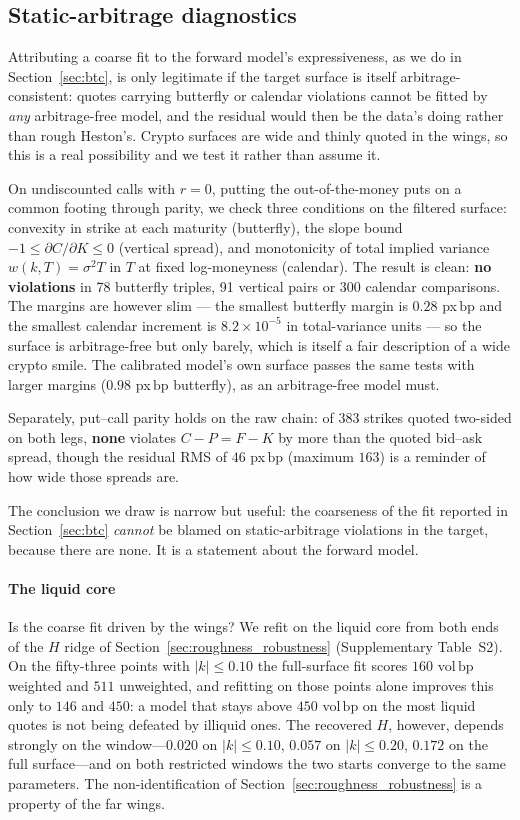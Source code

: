 \documentclass[preprint,12pt]{elsarticle}
\newcommand{\bp}{\ensuremath{\,\mathrm{bp}}}
\begin{document}
\subsection{Static-arbitrage diagnostics}
\label{sec:arbitrage}
Attributing a coarse fit to the forward model's expressiveness, as we do in
Section~\ref{sec:btc}, is only legitimate if the target surface is itself
arbitrage-consistent: quotes carrying butterfly or calendar violations cannot be
fitted by \emph{any} arbitrage-free model, and the residual would then be the
data's doing rather than rough Heston's. Crypto surfaces are wide and thinly
quoted in the wings, so this is a real possibility and we test it rather than
assume it.

On undiscounted calls with $r{=}0$, putting the out-of-the-money puts on a
common footing through parity, we check three conditions on the filtered
surface: convexity in strike at each maturity (butterfly), the slope bound
$-1\le \partial C/\partial K\le 0$ (vertical spread), and monotonicity of total
implied variance $w(k,T)=\sigma^2 T$ in $T$ at fixed log-moneyness (calendar).
The result is clean: \textbf{no violations} in 78 butterfly triples, 91 vertical
pairs or 300 calendar comparisons. The margins are however slim --- the smallest
butterfly margin is $0.28$ px\bp{} and the smallest calendar increment is
$8.2\times10^{-5}$ in total-variance units --- so the surface is arbitrage-free
but only barely, which is itself a fair description of a wide crypto smile. The
calibrated model's own surface passes the same tests with larger margins
($0.98$ px\bp{} butterfly), as an arbitrage-free model must.

Separately, put--call parity holds on the raw chain: of 383 strikes quoted
two-sided on both legs, \textbf{none} violates $C-P=F-K$ by more than the quoted
bid--ask spread, though the residual RMS of $46$ px\bp{} (maximum $163$) is a
reminder of how wide those spreads are.

The conclusion we draw is narrow but useful: the coarseness of the fit reported
in Section~\ref{sec:btc} \emph{cannot} be blamed on static-arbitrage violations
in the target, because there are none. It is a statement about the forward model.
\paragraph{The liquid core}
Is the coarse fit driven by the wings? We refit on the liquid core from both ends
of the $H$ ridge of Section~\ref{sec:roughness_robustness} (Supplementary
Table~S2). On the fifty-three points with $|k|\le0.10$ the full-surface fit
scores $160$ vol\bp{} weighted and $511$ unweighted, and refitting on those points
alone improves this only to $146$ and $450$: a model that stays above $450$
vol\bp{} on the most liquid quotes is not being defeated by illiquid ones. The
recovered $H$, however, depends strongly on the window---$0.020$ on
$|k|\le0.10$, $0.057$ on $|k|\le0.20$, $0.172$ on the full surface---and on both
restricted windows the two starts converge to the same parameters. The
non-identification of Section~\ref{sec:roughness_robustness} is a property of the
far wings.
\end{document}
